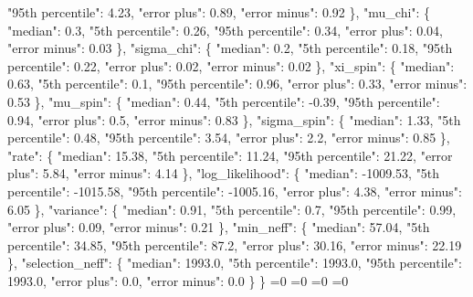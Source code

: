 {{        "95th percentile": 4.23, %
        "error plus": 0.89, %
        "error minus": 0.92%
      \}, %
      "mu\_chi": \{%
        "median": 0.3, %
        "5th percentile": 0.26, %
        "95th percentile": 0.34, %
        "error plus": 0.04, %
        "error minus": 0.03%
      \}, %
      "sigma\_chi": \{%
        "median": 0.2, %
        "5th percentile": 0.18, %
        "95th percentile": 0.22, %
        "error plus": 0.02, %
        "error minus": 0.02%
      \}, %
      "xi\_spin": \{%
        "median": 0.63, %
        "5th percentile": 0.1, %
        "95th percentile": 0.96, %
        "error plus": 0.33, %
        "error minus": 0.53%
      \}, %
      "mu\_spin": \{%
        "median": 0.44, %
        "5th percentile": {-}0.39, %
        "95th percentile": 0.94, %
        "error plus": 0.5, %
        "error minus": 0.83%
      \}, %
      "sigma\_spin": \{%
        "median": 1.33, %
        "5th percentile": 0.48, %
        "95th percentile": 3.54, %
        "error plus": 2.2, %
        "error minus": 0.85%
      \}, %
      "rate": \{%
        "median": 15.38, %
        "5th percentile": 11.24, %
        "95th percentile": 21.22, %
        "error plus": 5.84, %
        "error minus": 4.14%
      \}, %
      "log\_likelihood": \{%
        "median": {-}1009.53, %
        "5th percentile": {-}1015.58, %
        "95th percentile": {-}1005.16, %
        "error plus": 4.38, %
        "error minus": 6.05%
      \}, %
      "variance": \{%
        "median": 0.91, %
        "5th percentile": 0.7, %
        "95th percentile": 0.99, %
        "error plus": 0.09, %
        "error minus": 0.21%
      \}, %
      "min\_neff": \{%
        "median": 57.04, %
        "5th percentile": 34.85, %
        "95th percentile": 87.2, %
        "error plus": 30.16, %
        "error minus": 22.19%
      \}, %
      "selection\_neff": \{%
        "median": 1993.0, %
        "5th percentile": 1993.0, %
        "95th percentile": 1993.0, %
        "error plus": 0.0, %
        "error minus": 0.0%
      \}%
    \}}%
  \else%
    \ifnum{}=0%
      \let\MagBetaConstrainedIidTiltIsotropicTruncnormNid@I@out\MagBetaConstrainedIidTiltIsotropicTruncnormNid@III%
    \else%
      \ifnum{}=0%
      \let\MagBetaConstrainedIidTiltIsotropicTruncnormNid@I@out\MagBetaConstrainedIidTiltIsotropicTruncnormNid@IV%
    \else%
      \ifnum{}=0%
      \let\MagBetaConstrainedIidTiltIsotropicTruncnormNid@I@out\MagBetaConstrainedIidTiltIsotropicTruncnormNid@V%
    \else%
      \ifnum{}=0%
      \let\MagBetaConstrainedIidTiltIsotropicTruncnormNid@I@out\MagBetaConstrainedIidTiltIsotropicTruncnormNid@VI%
}

